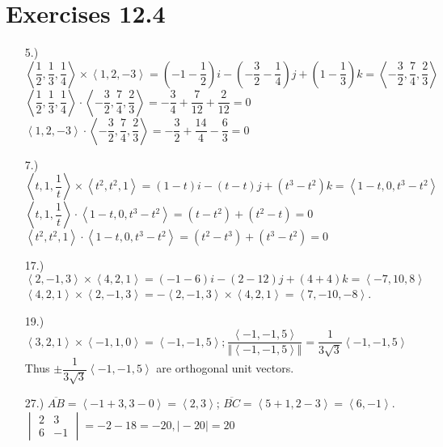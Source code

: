 \documentclass[12pt]{article}
\newcommand{\angleb}[1]{\left\langle#1\right\rangle}
\begin{document}
\pagestyle{fancy}
\fancyhead{}

\normalsize
\section*{Exercises 12.4}
\begin{itemize}
	\item [5.)] $\angleb{\dfrac{1}{2},\dfrac{1}{3},\dfrac{1}{4}}\times\angleb{1,2,-3}=\left(-1-\dfrac{1}{2}\right)i-\left(-\dfrac{3}{2}-\dfrac{1}{4}\right)j+\left(1-\dfrac{1}{3}\right)k=\angleb{-\dfrac{3}{2},\dfrac{7}{4},\dfrac{2}{3}}$\newline
	      $\angleb{\dfrac{1}{2},\dfrac{1}{3},\dfrac{1}{4}}\cdot\angleb{-\dfrac{3}{2},\dfrac{7}{4},\dfrac{2}{3}}=-\dfrac{3}{4}+\dfrac{7}{12}+\dfrac{2}{12}=0$\newline
	      $\angleb{1,2,-3}\cdot\angleb{-\dfrac{3}{2},\dfrac{7}{4},\dfrac{2}{3}}=-\dfrac{3}{2}+\dfrac{14}{4}-\dfrac{6}{3}=0$

	\item [7.)] $\angleb{t,1,\dfrac{1}{t}}\times\angleb{t^2,t^2,1}=\left(1-t\right)i-(t-t)j+(t^3-t^2)k=\angleb{1-t,0,t^3-t^2}$\newline
	      $\angleb{t,1,\dfrac{1}{t}}\cdot\angleb{1-t,0,t^3-t^2}=(t-t^2)+(t^2-t)=0$\newline
	      $\angleb{t^2,t^2,1}\cdot\angleb{1-t,0,t^3-t^2}=(t^2-t^3)+(t^3-t^2)=0$

	\item [17.)] $\angleb{2,-1,3}\times\angleb{4,2,1}=(-1-6)i-(2-12)j+(4+4)k=\angleb{-7,10,8}$\newline
	      $\angleb{4,2,1}\times\angleb{2,-1,3}=-\angleb{2,-1,3}\times\angleb{4,2,1}=\angleb{7,-10,-8}$.

	\item [19.)] $\angleb{3,2,1}\times\angleb{-1,1,0}=\angleb{-1,-1,5};\dfrac{\angleb{-1,-1,5}}{\Vert\angleb{-1,-1,5}\Vert}=\dfrac{1}{3\sqrt{3}}\angleb{-1,-1,5}$\newline
	      Thus $\pm\dfrac{1}{3\sqrt{3}}\angleb{-1,-1,5}$ are orthogonal unit vectors.

	\item [27.)] $\overline{AB}=\angleb{-1+3,3-0}=\angleb{2,3}$; $\overline{BC}=\angleb{5+1,2-3}=\angleb{6,-1}$.\newline
	      $\begin{vmatrix}
			      2 & 3 \\6&-1
		      \end{vmatrix}=-2-18=-20,\vert-20\vert=20$


\end{itemize}
\end{document}
